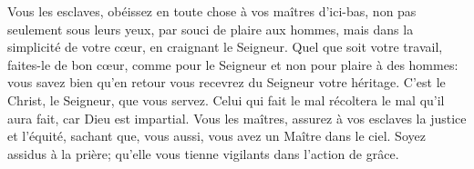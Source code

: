 Vous les esclaves, obéissez en toute chose à vos maîtres d’ici-bas,
	non pas seulement sous leurs yeux, par souci de plaire aux hommes,
	mais dans la simplicité de votre cœur, en craignant le Seigneur.
Quel que soit votre travail, faites-le de bon cœur,
	comme pour le Seigneur et non pour plaire à des hommes:
	vous savez bien qu’en retour vous recevrez du Seigneur votre héritage.
C’est le Christ, le Seigneur, que vous servez.
Celui qui fait le mal récoltera le mal qu’il aura fait,
	car Dieu est impartial.
Vous les maîtres, assurez à vos esclaves la justice et l’équité,
	sachant que, vous aussi, vous avez un Maître dans le ciel.
Soyez assidus à la prière;
	qu’elle vous tienne vigilants dans l’action de grâce.
